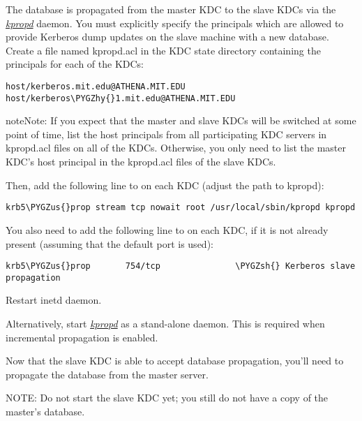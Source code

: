 \documentclass[letterpaper,10pt,english]{sphinxmanual}
\def\PYGZus{\char`\_}
\def\PYGZsh{\char`\#}
\def\PYGZhy{\char`\-}
\begin{document}
The database is propagated from the master KDC to the slave KDCs via
the {\hyperref[admin/admin_commands/kpropd:kpropd-8]{\emph{kpropd}}} daemon.  You must explicitly specify the
principals which are allowed to provide Kerberos dump updates on the
slave machine with a new database.  Create a file named kpropd.acl in
the KDC state directory containing the  principals for each of
the KDCs:

\begin{Verbatim}[commandchars=\\\{\}]
host/kerberos.mit.edu@ATHENA.MIT.EDU
host/kerberos\PYGZhy{}1.mit.edu@ATHENA.MIT.EDU
\end{Verbatim}

\begin{notice}{note}{Note:}
If you expect that the master and slave KDCs will be
switched at some point of time, list the host principals
from all participating KDC servers in kpropd.acl files on
all of the KDCs.  Otherwise, you only need to list the
master KDC's host principal in the kpropd.acl files of the
slave KDCs.
\end{notice}

Then, add the following line to  on each KDC
(adjust the path to kpropd):

\begin{Verbatim}[commandchars=\\\{\}]
krb5\PYGZus{}prop stream tcp nowait root /usr/local/sbin/kpropd kpropd
\end{Verbatim}

You also need to add the following line to  on each
KDC, if it is not already present (assuming that the default port is
used):

\begin{Verbatim}[commandchars=\\\{\}]
krb5\PYGZus{}prop       754/tcp               \PYGZsh{} Kerberos slave propagation
\end{Verbatim}

Restart inetd daemon.

Alternatively, start {\hyperref[admin/admin_commands/kpropd:kpropd-8]{\emph{kpropd}}} as a stand-alone daemon.  This is
required when incremental propagation is enabled.

Now that the slave KDC is able to accept database propagation, you’ll
need to propagate the database from the master server.

NOTE: Do not start the slave KDC yet; you still do not have a copy of
the master's database.
\end{document}
